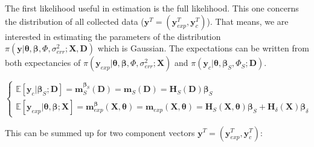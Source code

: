 \documentclass[soumission]{jsfds}
\edef\hc{\string: }
\begin{document}

The first likelihood useful in estimation is the full likelihood. This one concerns the distribution of all collected data ($\boldsymbol{y}^T=(\boldsymbol{y}_{exp}^T,\boldsymbol{y}_c^T)$). That means, we are interested in estimating the parameters of the distribution $\pi(\boldsymbol{y}|\boldsymbol{\theta},\boldsymbol{\beta},\Phi,\sigma_{err}^2;\boldsymbol{X},\boldsymbol{D})$ which is Gaussian.
The expectations can be written from both expectancies of $\pi(\boldsymbol{y}_{exp}|\boldsymbol{\theta},\boldsymbol{\beta},\Phi,\sigma_{err}^2;\boldsymbol{X})$ and $\pi(\boldsymbol{y}_c|\boldsymbol{\theta},\boldsymbol{\beta}_S,\Phi_S;\boldsymbol{D})$.

\begin{equation}
\begin{cases}
    \mathbb{E}[\boldsymbol{y}_c|\boldsymbol{\beta}_S;\boldsymbol{D}]= \boldsymbol{m}_S^{\boldsymbol{\beta}_S}(\boldsymbol{D})= \boldsymbol{m}_S(\boldsymbol{D}) = {\boldsymbol{H}_S}(\boldsymbol{D})\boldsymbol{\beta}_S\\
\mathbb{E}[\boldsymbol{y}_{exp}|\boldsymbol{\theta},\boldsymbol{\beta};\boldsymbol{X}]= \boldsymbol{m}_{exp}^{\boldsymbol{\beta}}(\boldsymbol{X},\boldsymbol{\theta}) = \boldsymbol{m}_{exp}(\boldsymbol{X},\boldsymbol{\theta}) = {\boldsymbol{H}_S}(\boldsymbol{X},\boldsymbol{\theta}) \boldsymbol{\beta}_S + {\boldsymbol{H}_{\delta}}(\boldsymbol{X})\boldsymbol{\beta}_{\delta}
\end{cases}
\label{eq:ExpPartialLikelihood}
\end{equation}

%
%

This can be summed up for two component vectors $\boldsymbol{y}^T=(\boldsymbol{y}_{exp}^T,\boldsymbol{y}_c^T)$\hc
 
\end{document}
